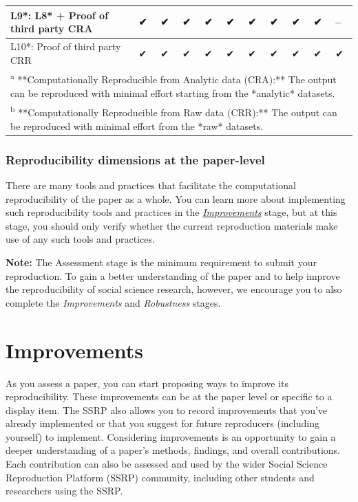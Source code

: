 \documentclass[
]{book}
\begin{document}
\begin{table}
\begin{tabular}[t]{l|l|l|l|l|l|l|l|l|l|l}
\hline
L9*: L8* + Proof of third party CRA & ✔ & ✔ & ✔ & ✔ & ✔ & ✔ & ✔ & ✔ & ✔ & --\\
\hline
L10*: Proof of third party CRR & ✔ & ✔ & ✔ & ✔ & ✔ & ✔ & ✔ & ✔ & ✔ & ✔\\
\hline
\multicolumn{11}{l}{\rule{0pt}{1em}\textsuperscript{a} **Computationally Reproducible from Analytic data (CRA):** The output can be reproduced with minimal effort starting from the *analytic* datasets.}\\
\multicolumn{11}{l}{\rule{0pt}{1em}\textsuperscript{b} **Computationally Reproducible from Raw data (CRR):** The output can be reproduced with minimal effort from the *raw* datasets.}\\
\end{tabular}
\end{table}

\hypertarget{reproducibility-dimensions-at-the-paper-level}{%
\subsection{Reproducibility dimensions at the paper-level}\label{reproducibility-dimensions-at-the-paper-level}}

There are many tools and practices that facilitate the computational reproducibility of the paper as a whole. You can learn more about implementing such reproducibility tools and practices in the \href{https://bitss.github.io/ACRE/improvements.html}{\emph{Improvements}} stage, but at this stage, you should only verify whether the current reproduction materials make use of any such tools and practices.

\textbf{Note:} The Assessment stage is the minimum requirement to submit your reproduction. To gain a better understanding of the paper and to help improve the reproducibility of social science research, however, we encourage you to also complete the \emph{Improvements} and \emph{Robustness} stages.

\hypertarget{improvements}{%
\chapter{Improvements}\label{improvements}}

As you assess a paper, you can start proposing ways to improve its reproducibility. These improvements can be at the paper level or specific to a display item. The SSRP also allows you to record improvements that you've already implemented or that you suggest for future reproducers (including yourself) to implement. Considering improvements is an opportunity to gain a deeper understanding of a paper's methods, findings, and overall contributions. Each contribution can also be assessed and used by the wider Social Science Reproduction Platform (SSRP) community, including other students and researchers using the SSRP.
\end{document}
